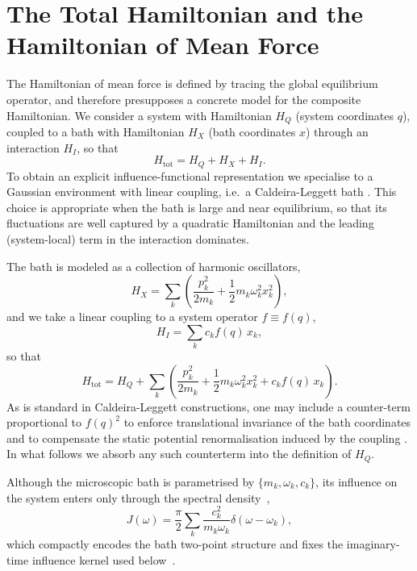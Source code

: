 \documentclass[aps,prl,twocolumn,superscriptaddress,showpacs,floatfix]{revtex4-2}
\begin{document}
 \section{\label{sec:model}The Total Hamiltonian and the Hamiltonian of Mean Force}
The Hamiltonian of mean force is defined by tracing the global equilibrium
operator, and therefore presupposes a concrete model for the composite
Hamiltonian. We consider a system with Hamiltonian $H_Q$ (system coordinates
$q$), coupled to a bath with Hamiltonian $H_X$ (bath coordinates $x$) through an
interaction $H_I$, so that
\begin{equation}
    H_{\mathrm{tot}}=H_Q+H_X+H_I.
    \label{eq:Htot_model}
\end{equation}
To obtain an explicit influence-functional representation we specialise to a
Gaussian environment with linear coupling, i.e.\ a Caldeira-Leggett bath \cite{caldeiraQuantumTunnellingDissipative1983a}. This
choice is appropriate when the bath is large and near equilibrium, so that its
fluctuations are well captured by a quadratic Hamiltonian and the leading
(system-local) term in the interaction dominates.

The bath is modeled as a collection of harmonic oscillators,
\begin{equation}
    H_X=\sum_k\left(\frac{p_k^2}{2m_k}+\frac{1}{2}m_k\omega_k^2 x_k^2\right),
    \label{eq:HX_model}
\end{equation}
and we take a linear coupling to a system operator $f\equiv f(q)$,
\begin{equation}
    H_I=\sum_k c_k f(q)\, x_k,
    \label{eq:HI_model}
\end{equation}
so that
\begin{equation}
    H_{\mathrm{tot}} = H_Q + \sum_k \left( \frac{p_k^2}{2m_k} + \frac{1}{2}m_k\omega_k^2 x_k^2 + c_k f(q)\, x_k \right).
    \label{eq:Htot_full}
\end{equation}
As is standard in Caldeira-Leggett constructions, one may include a counter-term
proportional to $f(q)^2$ to enforce translational invariance of the bath
coordinates and to compensate the static potential renormalisation induced by
the coupling \cite{caldeiraQuantumTunnellingDissipative1983a}. In what follows we absorb any such counterterm into the
definition of $H_Q$.

Although the microscopic bath is parametrised by $\{m_k,\omega_k,c_k\}$, its
influence on the system enters only through the spectral density~\cite{weissQuantumDissipativeSystems2012, breuerTheoryOpenQuantum2002},
\begin{equation}
    J(\omega) = \frac{\pi}{2} \sum_k \frac{c_k^2}{m_k \omega_k} \delta(\omega-\omega_k),
    \label{eq:spectral_density}
\end{equation}
which compactly encodes the bath two-point structure and fixes the imaginary-time influence kernel used below~\cite{feynmanTheoryGeneralQuantum1963a}.
\end{document}
